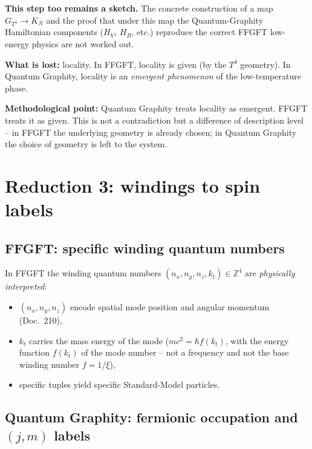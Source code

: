\textbf{This step too remains a sketch.} The concrete construction
of a map $G_{T^4} \to K_N$ and the proof that under this map the
Quantum-Graphity Hamiltonian components ($H_V$, $H_B$, etc.)
reproduce the correct FFGFT low-energy physics are not worked out.

\textbf{What is lost:} locality. In FFGFT, locality is given (by
the $T^4$ geometry). In Quantum Graphity, locality is an
\emph{emergent phenomenon} of the low-temperature phase.

\textbf{Methodological point:} Quantum Graphity treats locality as
emergent. FFGFT treats it as given. This is not a contradiction but
a difference of description level -- in FFGFT the underlying
geometry is already chosen; in Quantum Graphity the choice of
geometry is left to the system.

\section{Reduction 3: windings to spin labels}

\subsection{FFGFT: specific winding quantum numbers}

In FFGFT the winding quantum numbers
$(n_x, n_y, n_z, k_t) \in \mathbb{Z}^4$ are \emph{physically
interpreted}:
\begin{itemize}[leftmargin=2em,itemsep=2pt,topsep=2pt]
  \item $(n_x, n_y, n_z)$ encode spatial mode position and angular
        momentum (Doc.~210),
  \item $k_t$ carries the mass energy of the mode
        ($m c^2 = \hbar f(k_t)$, with the energy function $f(k_t)$ of
        the mode number -- not a frequency and not the base winding
        number $f = 1/\xi$),
  \item specific tuples yield specific Standard-Model particles.
\end{itemize}

\subsection{\texorpdfstring{Quantum Graphity: fermionic occupation and $(j, m)$ labels}{Quantum Graphity: fermionic occupation and (j,m) labels}}

